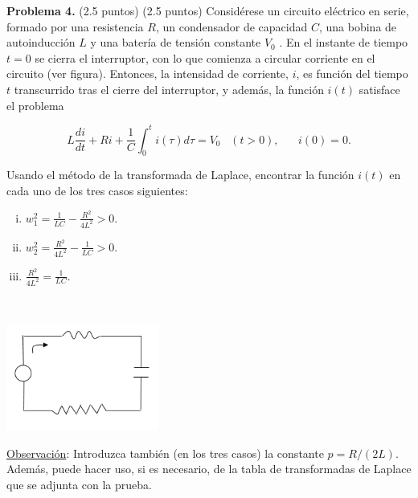 \textbf{Problema 4.} (2.5 puntos) (2.5 puntos) Considérese un circuito eléctrico en serie, formado por una resistencia
$R$, un condensador de capacidad $C$, una bobina de autoinducción $L$ y una batería de tensión
constante $V_0$ . En el instante de tiempo $t = 0$ se cierra el interruptor, con lo que comienza a
circular corriente en el circuito (ver figura). Entonces, la intensidad de corriente, $i$, es función del
tiempo $t$ transcurrido tras el cierre del interruptor, y además, la función $i(t)$ satisface el problema

\begin{equation*}
    L\frac{di}{dt} + R i + \frac{1}{C} \int_0^t i(\tau) d\tau = V_0 \hspace{10pt} (t > 0), \hspace{20pt} i(0) = 0.
\end{equation*}

Usando el método de la transformada de Laplace, encontrar la función $i(t)$ en cada uno de los
tres casos siguientes:

\begin{enumerate}[i)]
    \item $w_1^2 = \frac{1}{LC} - \frac{R^2}{4L^2} > 0$.
    \item $w_2^2 = \frac{R^2}{4L^2} - \frac{1}{LC} > 0$.
    \item $\frac{R^2}{4L^2} = \frac{1}{LC}$.

\end{enumerate}\\




\begin{center}
    \includegraphics[width=5cm]{files/img}
\end{center}



\underline{Observación}: Introduzca también (en los tres casos) la constante $p = R/ (2L)$. Además, puede
hacer uso, si es necesario, de la tabla de transformadas de Laplace que se adjunta con la prueba.